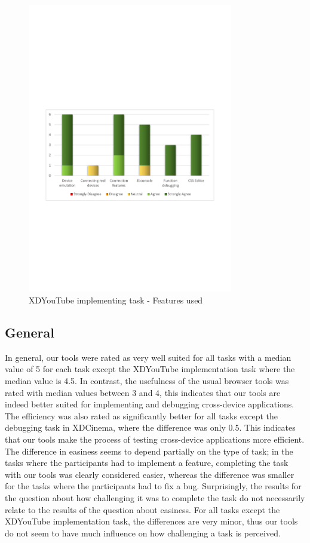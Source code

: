 \begin{figure}[H]
  \centering
    \includegraphics[width=0.8\textwidth]{images/charts/xdyt_impl_features_used.pdf}
	\caption[xdyt-impl: Features used]{XDYouTube implementing task - Features used}
	\label{fig:xdyt_impl_features_used}
\end{figure}

\subsection{General}

In general, our tools were rated as very well suited for all tasks with a median value of 5 for each task except the XDYouTube implementation task where the median value is 4.5. In contrast, the usefulness of the usual browser tools was rated with median values between 3 and 4, this indicates that our tools are indeed better suited for implementing and debugging cross-device applications. The efficiency was also rated as significantly better for all tasks except the debugging task in XDCinema, where the difference was only 0.5. This indicates that our tools make the process of testing cross-device applications more efficient. The difference in easiness seems to depend partially on the type of task; in the tasks where the participants had to implement a feature, completing the task with our tools was clearly considered easier, whereas the difference was smaller for the tasks where the participants had to fix a bug. Surprisingly, the results for the question about how challenging it was to complete the task do not necessarily relate to the results of the question about easiness. For all tasks except the XDYouTube implementation task, the differences are very minor, thus our tools do not seem to have much influence on how challenging a task is perceived.


